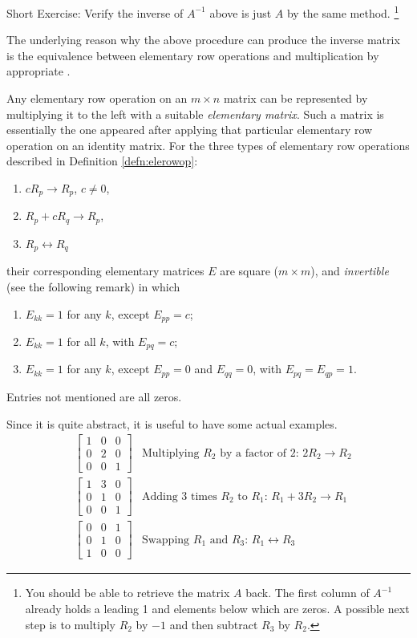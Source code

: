 Short Exercise: Verify the inverse of $A^{-1}$ above is just $A$ by the same method. \footnote{You should be able to retrieve the matrix $A$ back. The first column of $A^{-1}$ already holds a leading 1 and elements below which are zeros. A possible next step is to multiply $R_2$ by $-1$ and then subtract $R_3$ by $R_2$.}\par
The underlying reason why the above procedure can produce the inverse matrix is the equivalence between elementary row operations and multiplication by appropriate .
\begin{proper}
\label{proper:elementarymat}
Any elementary row operation on an $m \times n$ matrix can be represented by multiplying it to the left with a suitable \textit{elementary matrix}. Such a matrix is essentially the one appeared after applying that particular elementary row operation on an identity matrix. For the three types of elementary row operations described in Definition \ref{defn:elerowop}:
\begin{enumerate}
\item $cR_{p} \to R_{p}$, $c \neq 0$,
\item $R_{p} + cR_{q} \to R_{p}$,
\item $R_{p} \leftrightarrow R_{q}$
\end{enumerate}
their corresponding elementary matrices $E$ are square ($m \times m$), and \textit{invertible} (see the following remark) in which
\begin{enumerate}
\item $E_{kk} = 1$ for any $k$, except $E_{pp} = c$;
\item $E_{kk} = 1$ for all $k$, with $E_{pq} = c$;
\item $E_{kk} = 1$ for any $k$, except $E_{pp} = 0$ and $E_{qq} = 0$, with $E_{pq} = E_{qp} = 1$. 
\end{enumerate}
Entries not mentioned are all zeros.
\end{proper}
Since it is quite abstract, it is useful to have some actual examples.
\begin{align*}
&
\begin{bmatrix}
1 & 0 & 0 \\
0 & 2 & 0 \\
0 & 0 & 1
\end{bmatrix} & \text{Multiplying $R_2$ by a factor of $2$: } 2R_2 \to R_2 \\
&
\begin{bmatrix}
1 & 3 & 0 \\
0 & 1 & 0 \\
0 & 0 & 1
\end{bmatrix} & \text{Adding 3 times $R_2$ to $R_1$: } R_1 + 3R_2 \to R_1 \\
&
\begin{bmatrix}
0 & 0 & 1 \\
0 & 1 & 0 \\
1 & 0 & 0
\end{bmatrix} & \text{Swapping $R_1$ and $R_3$: } R_1 \leftrightarrow R_3 
\end{align*}
